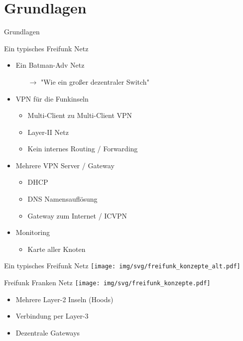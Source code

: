 \section{Grundlagen}
\begin{frame}{}
    \begin{center}
        Grundlagen
     \end{center}
\end{frame}

\begin{frame}{Ein typisches Freifunk Netz}
    \begin{itemize}
        \item Ein Batman-Adv Netz
        \begin{itemize}
            \item[$\rightarrow$] "Wie ein großer dezentraler Switch"
        \end{itemize}
        \item VPN für die Funkinseln
        \begin{itemize}
            \item Multi-Client zu Multi-Client VPN
            \item Layer-II Netz
            \item Kein internes Routing / Forwarding
        \end{itemize}
        \item Mehrere VPN Server / Gateway
        \begin{itemize}
            \item DHCP
            \item DNS Namensauflösung
            \item Gateway zum Internet / ICVPN
        \end{itemize}
        \item Monitoring
        \begin{itemize}
            \item Karte aller Knoten
        \end{itemize}
    \end{itemize}
\end{frame}

\begin{frame}{Ein typisches Freifunk Netz}
    \texttt{[image: img/svg/freifunk\_konzepte\_alt.pdf]}
\end{frame}

\begin{frame}{Freifunk Franken Netz}
    \texttt{[image: img/svg/freifunk\_konzepte.pdf]}

    \begin{itemize}
        \item Mehrere Layer-2 Inseln (Hoods)
        \item Verbindung per Layer-3
        \item Dezentrale Gateways
    \end{itemize}
\end{frame}

